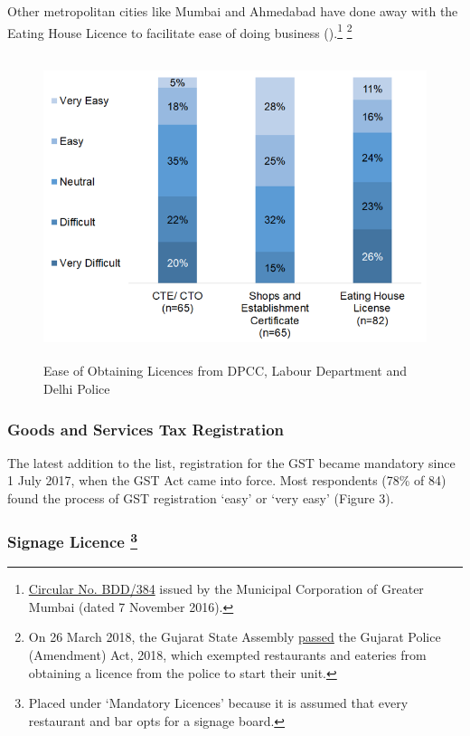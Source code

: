 \documentclass[a4paper, 12pt]{article}
\begin{document}
                   Other metropolitan cities like Mumbai and Ahmedabad have done away with the Eating House Licence to facilitate ease of doing business (\cite{toi2018ehl}).\footnote{\href{https://bit.ly/2xiMwpL}{Circular No. BDD/384} issued by the Municipal 
Corporation of Greater Mumbai (dated 7 November 2016).} \footnote{On 26 March 2018, the Gujarat State Assembly \href{https://bit.ly/2xktGyu}{passed} the Gujarat Police (Amendment) Act, 2018, which exempted restaurants and eateries from obtaining a licence 
from the police to start their unit.}
                   
 			\begin{figure}[H]
                    		\centering
                    		\includegraphics[height = 3.5in]{Figure2.png}
                    		\caption[Optional Caption]{Ease of Obtaining Licences from DPCC, Labour Department and Delhi Police}
			\end{figure}

		\subsubsection{Goods and Services Tax Registration}
		The latest addition to the list, registration for the GST became mandatory since 1 July 2017, when the GST Act came into force. Most respondents (78\% of 84) found the process of GST registration ‘easy’ or ‘very easy’ (Figure 3).
		
		\subsubsection[Signage Licence]{Signage Licence \footnote{Placed under ‘Mandatory Licences’ because it is assumed that every restaurant and bar opts for a signage board.}}
		
\end{document}
